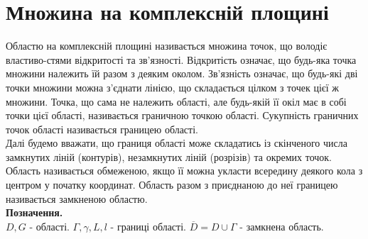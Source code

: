 \section{Множина на комплексній площині}
Областю на комплексній площині називається множина точок, що володіє властиво-стями відкритості та зв'язності. Відкритість означає, що будь-яка точка множини належить їй разом з деяким околом. Зв'язність означає, що будь-які дві точки множини можна з'єднати лінією, що складається цілком з точек цієї ж множини. Точка, що сама не належить області, але будь-якій її окіл має в собі точки цієї області, називається граничною точкою області. Сукупність граничних точок області називається границею області. \\Далі будемо вважати, що границя області може складатись із скінченого числа замкнутих ліній (контурів), незамкнутих ліній (розрізів) та окремих точок. Область називається обмеженою, якщо її можна укласти всередину деякого кола з центром у початку координат. Область разом з приєднаною до неї границею називається замкненою областю. \\
\textbf{Позначення. }\\$D,G$ - області. $\Gamma,\gamma,L,l$ - границі області. $\overline{D}=D\cup\Gamma$ - замкнена область.
\begin{figure*}[htp]\centering
	\tab 
\end{figure*}\\
